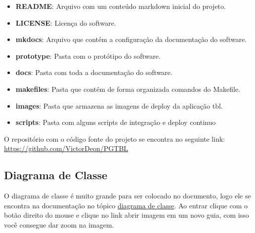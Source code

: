 \begin{itemize}
\begin{itemize}
    \item \textbf{README}: Arquivo com um conteúdo markdown inicial do projeto.
    \item \textbf{LICENSE}: Licença do software.
    \item \textbf{mkdocs}: Arquivo que contém a configuração da documentação do software.
    \item \textbf{prototype}: Pasta com o protótipo do software.
    \item \textbf{docs}: Pasta com toda a documentação do software.
    \item \textbf{makefiles}: Pasta que contém de forma organizada comandos do Makefile.
    \item \textbf{images}: Pasta que armazena as imagens de deploy da aplicação tbl.
    \item \textbf{scripts}: Pasta com alguns scripts de integração e deploy continuo
  \end{itemize}
\end{itemize}

O repositório com o código fonte do projeto se encontra no seguinte link: \url{https://github.com/VictorDeon/PGTBL}

\subsection{Diagrama de Classe}

O diagrama de classe é muito grande para ser colocado no documento, logo ele se encontra na documentação no tópico
\href{https://victordeon.github.io/PGTBL/contribuicao/arquitetura/#3-diagrama-de-classe}{diagrama de classe}.
Ao entrar clique com o botão direito do mouse e clique no link abrir imagem em um novo guia, com isso você consegue
dar zoom na imagem.
